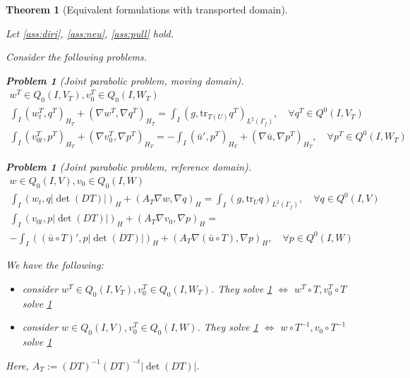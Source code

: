 \documentclass[english,a4paper,10pt,oneside]{scrbook}	%
\theoremstyle{break}
\newtheorem{thm}[equation]{Theorem}
\newtheorem{pb}[equation]{Problem}
\theoremstyle{remark}
\newcommand{\tr}{\text{tr}}
\begin{document}
\begin{thm}[Equivalent formulations with transported domain]
\label{thm:eq_pde}

Let \cref{ass:diri}, \cref{ass:neu}, \cref{ass:pull} hold.

Consider the following problems.

\begin{pb}[Joint parabolic problem, moving domain]
\label{pb:joint_mov}
\begin{align*}
w^T \in Q_0(I, V_T), v_0^T \in Q_0(I,W_T) \\
\int_I  (w^T_t , q^T)_{H_T}+ (\nabla w^T, \nabla q^T)_{H_T} = \int_I(g,\tr_{T(U)} q^T)_{L^2(\Gamma_f)}, \quad \forall q^T \in Q^0(I, V_T) \\
\int_I (v^T_{0t},p^T)_{H_T} + (\nabla v_0^T, \nabla p^T)_{H_T}= -\int_I(\bar{u}',p^T)_{H_T}+(\nabla \bar{u}, \nabla p^T)_{H_T}, \quad \forall p^T \in Q^0(I, W_T)
\end{align*}
\end{pb}

\begin{pb}[Joint parabolic problem, reference domain]
\label{pb:joint_ref}
\begin{align*}
w \in Q_0(I, V), v_0 \in Q_0(I,W) \\
\int_I ( w_t , q |\det(DT)|)_H+ (A_T\nabla w, \nabla q)_{H} =\int_I(g,\tr_{U} q)_{L^2(\Gamma_f)}, \quad \forall q \in Q^0(I, V) \\
\int_I ( v_{0t},p |\det(DT)|)_H + (A_T \nabla v_0, \nabla p)_{H}=\\ -\int_I((\bar{u}\circ T)',p|\det(DT)|)_{H}+(A_T \nabla (\bar{u} \circ T), \nabla p)_{H}, \quad \forall p \in Q^0(I, W)
\end{align*}
\end{pb}

We have the following:

\begin{itemize}
	\item consider $w^T \in Q_0(I, V_T), v_0^T \in Q_0(I,W_T)$. They solve \cref{pb:joint_mov} $\iff$ $w^T\circ T , v_0^T\circ T $ solve \cref{pb:joint_ref}
	\item consider $w \in Q_0(I, V), v_0^T \in Q_0(I,W)$. They solve \cref{pb:joint_ref} $\iff$ $w\circ T^{-1}, v_0\circ T^{-1}$ solve \cref{pb:joint_mov} 

\end{itemize}

Here, $A_T:=  (DT)^{-1}(DT)^{-t}|\det(DT)|$.

\end{thm}
\end{document}
